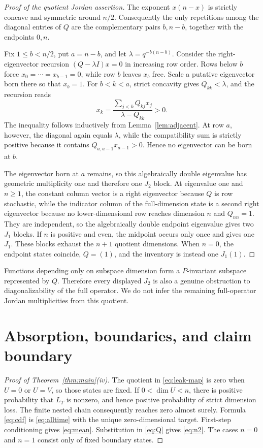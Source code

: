 \documentclass[a4paper,10pt]{amsart}
\theoremstyle{remark}
\begin{document}
\begin{proof}[Proof of the quotient Jordan assertion]
The exponent $x(n-x)$ is strictly concave and symmetric around $n/2$.
Consequently the only repetitions among the diagonal entries of $Q$ are the
complementary pairs $b,n-b$, together with the endpoints $0,n$.

Fix $1\le b<n/2$, put $a=n-b$, and let
$\lambda=q^{-b(n-b)}$.  Consider the right-eigenvector recursion
$(Q-\lambda I)x=0$ in increasing row order.  Rows below $b$ force
$x_0=\cdots=x_{b-1}=0$, while row $b$ leaves $x_b$ free.  Scale a putative
eigenvector born there so that $x_b=1$.  For $b<k<a$, strict concavity gives
$Q_{kk}<\lambda$, and the recursion reads
\[
 x_k=\frac{\sum_{j<k}Q_{kj}x_j}{\lambda-Q_{kk}}>0.
\]
The inequality follows inductively from Lemma~\ref{lem:adjacent}.  At row
$a$, however, the diagonal again equals $\lambda$, while the compatibility
sum is strictly positive because it contains
$Q_{a,a-1}x_{a-1}>0$.  Hence no eigenvector can be born at $b$.

The eigenvector born at $a$ remains, so this algebraically double eigenvalue
has geometric multiplicity one and therefore one $J_2$ block.  At eigenvalue
one and $n\ge1$, the constant column vector is a right eigenvector because
$Q$ is row stochastic, while the indicator column of the full-dimension
state is a second right eigenvector because no lower-dimensional row reaches
dimension $n$ and $Q_{nn}=1$.  They are independent, so the algebraically
double endpoint eigenvalue gives two $J_1$ blocks.  If $n$ is positive and
even, the midpoint occurs only once and gives one $J_1$.  These blocks
exhaust the $n+1$ quotient dimensions.  When $n=0$, the endpoint states
coincide, $Q=(1)$, and the inventory is instead one $J_1(1)$.
\end{proof}

Functions depending only on subspace dimension form a $P$-invariant
subspace represented by $Q$.  Therefore every displayed $J_2$ is also a
genuine obstruction to diagonalizability of the full operator.  We do not
infer the remaining full-operator Jordan multiplicities from this quotient.

\section{Absorption, boundaries, and claim boundary}

\begin{proof}[Proof of Theorem~\ref{thm:main}(iv)]
The quotient in \eqref{eq:leak-map} is zero when $U=0$ or $U=V$, so those
states are fixed.  If $0<\dim U<n$, there is positive probability that
$L_T$ is nonzero, and hence positive probability of strict dimension loss.
The finite nested chain consequently reaches zero almost surely.  Formula
\eqref{eq:cdf} is \eqref{eq:alltime} with the unique zero-dimensional
target.  First-step conditioning gives \eqref{eq:mean}.  Substitution in
\eqref{eq:Q} gives \eqref{eq:n2}.  The cases $n=0$ and $n=1$ consist only of
fixed boundary states.
\end{proof}
\end{document}
